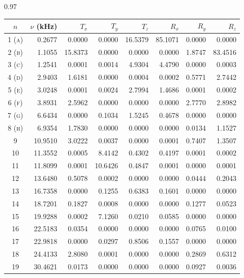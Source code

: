 \documentclass[../Thesis-IJspeert.tex]{subfiles}
\begin{document}
\begin{spacing}{0.97}
	\begin{small}
		\begin{longtable}{crrrrrrr}
			\toprule
			{$n$} & {$\nu$ (\si{\kilo\hertz})} & {${T}_x$} & {${T}_y$} & {${T}_z$} & {${R}_x$} & {${R}_y$} & {${R}_z$} \\
			\midrule
			1 \textsc{(a)} & 0.2677 & 0.0000 & 0.0000 & 16.5379 & 85.1071 & 0.0000 & 0.0000 \\  
			2 \textsc{(b)} & 1.1055 & 15.8373 & 0.0000 & 0.0000 & 0.0000 & 1.8747 & 83.4516 \\  
			3 \textsc{(c)} & 1.2541 & 0.0001 & 0.0014 & 4.9304 & 4.4790 & 0.0000 & 0.0003 \\  
			4 \textsc{(d)} & 2.9403 & 1.6181 & 0.0000 & 0.0004 & 0.0002 & 0.5771 & 2.7442 \\  
			5 \textsc{(e)} & 3.0248 & 0.0001 & 0.0024 & 2.7994 & 1.4686 & 0.0001 & 0.0002 \\  
			6 \textsc{(f)} & 3.8931 & 2.5962 & 0.0000 & 0.0000 & 0.0000 & 2.7770 & 2.8982 \\  
			7 \textsc{(g)} & 6.6434 & 0.0000 & 0.1034 & 1.5245 & 0.4678 & 0.0000 & 0.0000 \\  
			8 \textsc{(h)} & 6.9354 & 1.7830 & 0.0000 & 0.0000 & 0.0000 & 0.0134 & 1.1527 \\  
			9 & 10.9510 & 3.0222 & 0.0037 & 0.0000 & 0.0001 & 0.7407 & 1.3507 \\  
			10 & 11.3552 & 0.0005 & 8.4142 & 0.4302 & 0.4197 & 0.0001 & 0.0002 \\  
			11 & 11.8099 & 0.0001 & 10.6426 & 0.4847 & 0.0001 & 0.0000 & 0.0001 \\  
			12 & 13.6480 & 0.5078 & 0.0002 & 0.0000 & 0.0000 & 0.0444 & 0.2043 \\  
			13 & 16.7358 & 0.0000 & 0.1255 & 0.6383 & 0.1601 & 0.0000 & 0.0000 \\  
			14 & 18.7201 & 0.1827 & 0.0008 & 0.0000 & 0.0000 & 0.1277 & 0.0523 \\  
			15 & 19.9288 & 0.0002 & 7.1260 & 0.0210 & 0.0585 & 0.0000 & 0.0000 \\  
			16 & 22.5183 & 0.0354 & 0.0000 & 0.0000 & 0.0000 & 0.0765 & 0.0100 \\  
			17 & 22.9818 & 0.0000 & 0.0297 & 0.8506 & 0.1557 & 0.0000 & 0.0000 \\  
			18 & 24.4133 & 2.8080 & 0.0001 & 0.0000 & 0.0000 & 0.2869 & 0.6312 \\  
			19 & 30.4621 & 0.0173 & 0.0000 & 0.0000 & 0.0000 & 0.0927 & 0.0036 \\  

\end{longtable}
\end{small}
\end{spacing}
\end{document}
